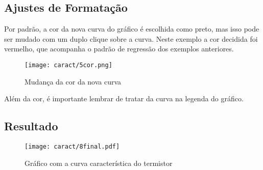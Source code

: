 \subsection{Ajustes de Formatação}

    Por padrão, a cor da nova curva do gráfico é escolhida como preto, mas isso pode ser mudado com um duplo clique sobre a curva. Neste exemplo a cor decidida foi vermelho, que acompanha o padrão de regressão dos exemplos anteriores.

    \begin{figure}[htbp]
        \centering
        \texttt{[image: caract/5cor.png]}

        \caption{Mudança da cor da nova curva}
        \label{fig:caract:cor}
    \end{figure}

    Além da cor, é importante lembrar de tratar da curva na legenda do gráfico.

\subsection{Resultado}

    \begin{figure}[htbp]
        \centering
        \texttt{[image: caract/8final.pdf]}

        \caption{Gráfico com a curva característica do termistor}
        \label{fig:caract:final}
    \end{figure}
